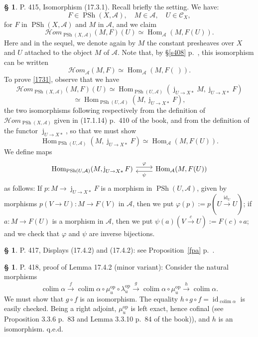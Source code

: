 \documentclass[12pt]{article}%
\theoremstyle{remark}
\theoremstyle{definition}
\newtheorem{s}[thm]{\S}%
\newcommand{\cc}{\mathcal}
\newcommand{\oo}{\operatorname}
\newcommand{\A}{\mathcal A}
\newcommand{\C}{\mathcal C}
\newcommand{\pp}{\varphi}
\newcommand{\HOM}{\cc H\mathit{om}}
\newcommand{\xr}{\xrightarrow}
\DeclareMathOperator*{\colim}{colim}
\DeclareMathOperator{\id}{id}
\DeclareMathOperator{\Hom}{Hom}%
\DeclareMathOperator{\op}{op}
\DeclareMathOperator{\PSh}{PSh}
\begin{document}
\begin{s}
P. 415, Isomorphism (17.3.1). Recall briefly the setting. We have: 
$$
F\in\oo{PSh}(X,\A),\quad M\in\A,\quad U\in\C_X,
$$ 
for $F$ in $\PSh(X,\A)$ and $M$ in $\A$, and we claim 
\begin{equation}\label{1731}
\HOM_{\oo{PSh}(X,\A)}(M,F)(U)\simeq\Hom_\A(M,F(U)).
\end{equation} 
Here and in the sequel, we denote again by $M$ the constant presheaves over $X$ and $U$ attached to the object $M$ of $\A$. Note that, by \S\ref{s408} p.~\pageref{s408}, this isomorphism can be written 
$$
\HOM_\A(M,F)\simeq\Hom_\A(M,F(\ )).
$$ 
To prove \eqref{1731}, observe that we have  
$$
\HOM_{\oo{PSh}(X,\A)}(M,F)(U)\simeq\Hom_{\oo{PSh}(U,\A)}(\oo j_{U\to X*}M,\oo j_{U\to X*}F)
$$ 
$$
\simeq\Hom_{\oo{PSh}(U,\A)}(M,\oo j_{U\to X*}F), 
$$ 
the two isomorphisms following respectively from the definition of $\HOM_{\oo{PSh}(X,\A)}$ given in (17.1.14) p.~410 of the book, and from the definition of the functor $\oo j_{U\to X*}$, so that we must show 
$$
\Hom_{\oo{PSh}(U,\A)}(M,\oo j_{U\to X*}F)\simeq\Hom_\A(M,F(U)).
$$
We define maps 
$$
\begin{tikzcd}
\Hom_{\oo{PSh}(U,\A)}(M,\oo j_{U\to X*}F)\ar[yshift=0.7ex]{r}{\pp}&\Hom_\A(M,F(U))\ar[yshift=-0.7ex]{l}{\psi}
\end{tikzcd} 
$$ 
as follows: If $p:M\to\oo j_{U\to X*}F$ is a morphism in $\oo{PSh}(U,\A)$, given by morphisms $p(V\to U):M\to F(V)$ in $\A$, then we put $\pp(p):=p(U\xr{\id_U}U)$; if $a:M\to F(U)$ is a morphism in $\A$, then we put $\psi(a)(V\xr cU):=F(c)\circ a$; and we check that $\pp$ and $\psi$ are inverse bijections. 
\end{s}

%


%

\begin{s}
P. 417, Displays (17.4.2) and (17.4.2): see Proposition~\ref{fpa} p.~\pageref{fpa}.
\end{s}

%

\begin{s} 
P. 418, proof of Lemma 17.4.2 (minor variant): Consider the natural morphisms 
$$
\colim\alpha\xr f\colim\alpha\circ\mu_u^{\op}\circ\lambda_u^{\op}\xr g\colim\alpha\circ\mu_u^{\op}\xr h\colim\alpha.
$$
We must show that $g\circ f$ is an isomorphism. The equality $h\circ g\circ f=\id_{\colim\alpha}$ is easily checked. Being a right adjoint, $\mu_u^{\op}$ is left exact, hence cofinal (see Proposition 3.3.6 p.~83 and Lemma 3.3.10 p.~84 of the book)), and $h$ is an isomorphism. q.e.d.
\end{s}  
\end{document}
